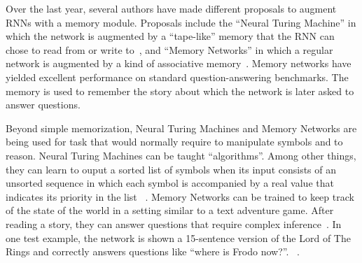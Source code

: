 \documentclass[10pts]{article}
\begin{document}
Over the last year, several authors have made different proposals to
augment RNNs with a memory module. 
Proposals include the ``Neural Turing Machine'' in which the
network is augmented by a ``tape-like'' memory that the RNN
can chose to read from or write to~\citep{Graves-et-al-arxiv2014}, and
``Memory Networks'' in which a regular network is augmented by a
kind of associative memory~\citep{weston-memorynet-2014}. Memory
networks have yielded excellent performance on standard
question-answering benchmarks. The memory is used to remember the
story about which the network is later asked to answer questions.





Beyond simple memorization, Neural Turing Machines and Memory Networks
are being used for task that would normally require to manipulate
symbols and to reason.
Neural Turing Machines can be taught ``algorithms''. Among other
things, they can learn to ouput a sorted list of symbols when its
input consists of an unsorted sequence in which each symbol is
accompanied by a real value that indicates its priority in the list
~\citep{Graves-et-al-arxiv2014}.
Memory Networks can be trained to keep track of the state of the world
in a setting similar to a text adventure game. After reading a story,
they can answer questions that require complex 
inference~\cite{weston-babi-arxiv-2015}.
In one test
example, the network is shown a 15-sentence version of the Lord of The
Rings and correctly answers questions like ``where is Frodo now?''.
~\citep{weston-memorynet-2014}.
\end{document}
